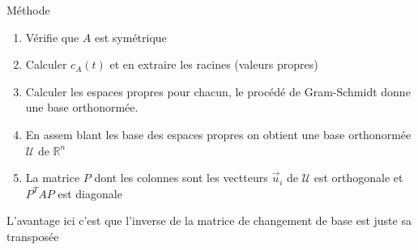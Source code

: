 \begin{parag}{Méthode}
\begin{enumerate}
    \item Vérifie que $A$ est symétrique
    \item Calculer $c_A(t)$ et en extraire les racines (valeurs propres)
    \item Calculer les espaces propres pour chacun, le procédé de Gram-Schmidt donne une base orthonormée.
    \item En assem blant les base des espaces propres on obtient une base orthonormée $\mathcal{U}$ de $\mathbb{R}^n$
    \item La matrice $P$ dont les colonnes sont les vectteurs $\vec{u}_i$ de $\mathcal{U}$ est orthogonale et $P^TAP$ est diagonale
\end{enumerate}   
\begin{framedremark}
    L'avantage ici c'est que l'inverse de la matrice de changement de base est juste sa transposée
\end{framedremark}
\end{parag}
